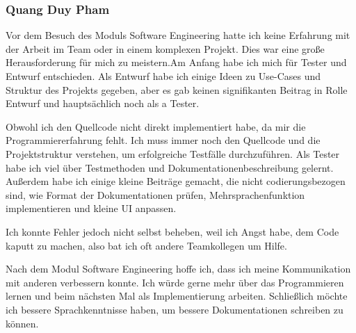 \documentclass[10pt]{article}
\begin{document}
\subsubsection{Quang Duy Pham}
	Vor dem Besuch des Moduls Software Engineering hatte ich keine Erfahrung mit der Arbeit im Team oder in einem komplexen Projekt. Dies war eine große Herausforderung für mich zu meistern.Am Anfang habe ich mich für Tester und Entwurf entschieden. Als Entwurf habe ich einige Ideen zu Use-Cases und Struktur des Projekts gegeben, aber es gab keinen signifikanten Beitrag in Rolle Entwurf und hauptsächlich noch als a Tester.\par
	Obwohl ich den Quellcode nicht direkt implementiert habe, da mir die Programmiererfahrung fehlt. Ich muss immer noch den Quellcode und die Projektstruktur verstehen, um erfolgreiche Testfälle durchzuführen. Als Tester habe ich viel über Testmethoden und Dokumentationenbeschreibung gelernt. Außerdem habe ich einige kleine Beiträge gemacht, die nicht codierungsbezogen sind, wie Format der Dokumentationen prüfen, Mehrsprachenfunktion implementieren und kleine UI anpassen.\par
	Ich konnte Fehler jedoch nicht selbst beheben, weil ich Angst habe, dem Code kaputt zu machen, also bat ich oft andere Teamkollegen um Hilfe.\par
	Nach dem Modul Software Engineering hoffe ich, dass ich meine Kommunikation mit anderen verbessern konnte. Ich würde gerne mehr über das Programmieren lernen und beim nächsten Mal als Implementierung arbeiten. Schließlich möchte ich bessere Sprachkenntnisse haben, um bessere Dokumentationen schreiben zu können.\par
\end{document}
